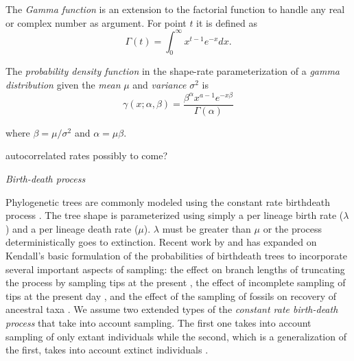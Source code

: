 \documentclass{llncs}
\newcommand{\ejmcomment}[1]{{\color{green} #1}}
\renewcommand{\subsection}[1]{%
\bigskip
\begin{center}
\begin{large}
\normalfont\itshape #1
\end{large}
\end{center}}
\begin{document}
The {\em Gamma function} is an extension to the factorial function to handle
any real or complex number as argument. For point $t$ it is defined as
$$\Gamma(t) = \int_0^\infty x^{t-1} e^{-x} dx.$$

The {\em probability density function} in the shape-rate parameterization of a
{\em gamma distribution} given the {\em mean} $\mu$ and {\em variance} $\sigma^2$ 
is
$$ \gamma(x;\alpha,\beta) = \frac{\beta^{\alpha}x^{a-1}e^{-x\beta}}{\Gamma(\alpha)} $$

where $\beta = \mu / \sigma^2$ and $\alpha = \mu \beta$.

\ejmcomment{autocorrelated rates possibly to come?}

\subsection{Birth-death process}
Phylogenetic trees are commonly modeled using the constant rate birth\textendash death process \citep{Kendall1948}.
The tree shape is parameterized using simply a per lineage birth rate ($\lambda$) and a per lineage death rate ($\mu$).
$\lambda$ must be greater than $\mu$ or the process deterministically goes to extinction.
Recent work by \citet{Gernhard2008} and \citet{Stadler2009, Stadler2010} has expanded on Kendall's basic 
formulation of the probabilities of birth\textendash death trees to incorporate several important aspects of sampling:
the effect on branch lengths of truncating the process by sampling tips at the present \citep{Gernhard2008},
the effect of incomplete sampling of tips at the present day \citep{Stadler2009}, and the effect of the sampling
of fossils on recovery of ancestral taxa \citep{Stadler2010}.
We assume two extended types of the {\em constant rate birth-death process}
that take into account sampling. The
first one takes into account sampling of only extant individuals
\citep{Stadler2009} while the second, which is a generalization of the first,
takes into account extinct individuals \citep{Stadler2010}.
\end{document}
